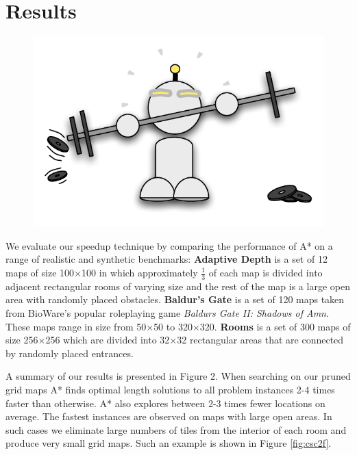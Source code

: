\section{Results}
 \begin{figure}
\vspace{-5em}
		\includegraphics[width=0.45\columnwidth, trim=10mm 0mm 0mm 0mm]{diagrams/robot_weights.pdf}
 \end{figure}

We evaluate our speedup technique by comparing the performance of A* on a range of realistic and synthetic benchmarks:
\newline 
\textbf{Adaptive Depth} is a set of 12 maps of size 100$\times$100 in which approximately
$\frac{1}{3}$ of each map is divided into adjacent rectangular rooms of
varying size and the rest of the map is a large open area with randomly placed obstacles.
\newline
\textbf{Baldur's Gate} is a set of 120 maps taken from BioWare's popular
roleplaying game \emph{Baldurs Gate II: Shadows of Amn}. 
These maps range in size from 50$\times$50 to 320$\times$320.
\newline
\textbf{Rooms} is a set of 300 maps of size 256$\times$256 which are divided into 32$\times$32
rectangular areas that are connected by randomly placed entrances.
\newline 

A summary of our results is presented in Figure 2. %
When searching on our pruned grid maps A* finds optimal length solutions to all problem 
instances 2-4 times faster than otherwise.
A* also explores between 2-3 times fewer locations on average. 
The fastest instances are observed on maps with large open areas.
In such cases we eliminate large numbers of tiles from the interior of each room 
and produce very small grid maps. 
Such an example is shown in Figure \ref{fig:csc2f}.

